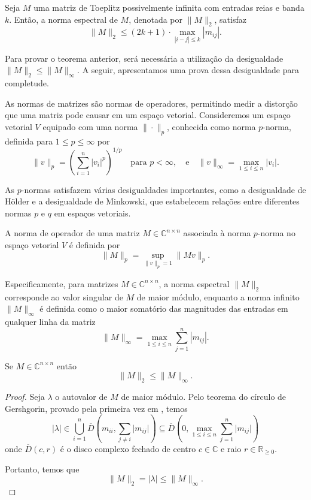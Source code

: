 \begin{theorem} \label{norm} Seja $M$ uma matriz de Toeplitz possivelmente infinita com entradas reias e banda $k$. Então, a norma espectral de $M$, denotada por $\| M \|_2$, satisfaz \[ \| M \|_2 \leq (2k + 1) \cdot \max_{|i - j| \leq k} |m_{ij}|. \] \end{theorem}

Para provar o teorema anterior, será necessária a utilização da desigualdade $\|M\|_2 \leq \|M\|_\infty$. A seguir, apresentamos uma prova dessa desigualdade para completude.

As normas de matrizes são normas de operadores, permitindo medir a distorção que uma matriz pode causar em um espaço vetorial. Consideremos um espaço vetorial $V$ equipado com uma norma $\| \cdot \|_p$, conhecida como norma $p$-norma, definida para $1 \leq p \leq \infty$ por
\[
  \| v \|_p = \left( \sum_{i=1}^{n} |v_i|^p \right)^{1/p} \quad \text{para } p < \infty, \quad \text{e} \quad \| v \|_\infty = \max_{1 \leq i \leq n} |v_i|.
\]

As $p$-normas satisfazem várias desigualdades importantes, como a desigualdade de Hölder e a desigualdade de Minkowski, que estabelecem relações entre diferentes normas $p$ e $q$ em espaços vetoriais.

A norma de operador de uma matriz $M \in \mathbb{C}^{n \times n}$ associada à norma $p$-norma no espaço vetorial $V$ é definida por
\[
  \| M \|_{p} = \sup_{\| v \|_p = 1} \| M v \|_p.
\]

Especificamente, para matrizes $ M \in \mathbb{C}^{n \times n} $, a norma espectral $\| M \|_2$ corresponde ao valor singular de $ M $ de maior módulo, enquanto a norma infinito $\| M \|_\infty$ é definida como o maior somatório das magnitudes das entradas em qualquer linha da matriz
\[
  \| M \|_\infty = \max_{1 \leq i \leq n} \sum_{j=1}^{n} |m_{ij}|.
\]

\begin{theorem}
  Se $M \in \mathbb{C}^{n \times n} $ então
  \[
    \| M \|_2 \leq \| M \|_\infty.
  \]
\end{theorem}

\begin{proof}
  Seja $\lambda$ o autovalor de $M$ de maior módulo. Pelo teorema do círculo de Gershgorin, provado pela primeira vez em \cite{Gerschgorin}, temos
  \[
    \lvert \lambda \rvert \in \bigcup_{i = 1}^n \overline{D}\left(m_{ii}, \sum_{j \ne i} \lvert m_{ij} \rvert\right) \subseteq \overline{D}\left(0, \max_{1 \leq i \leq n} \sum_{j=1}^{n} \lvert m_{ij}\rvert\right)
  \] onde $\overline{D}(c, r)$ é o disco complexo fechado de centro $c \in \mathbb{C}$ e raio $r \in \mathbb{R}_{\ge 0}$.

  Portanto, temos que
  \[
    \| M \|_2 = \lvert \lambda \lvert \leq \| M \|_\infty.
  \]
\end{proof}

